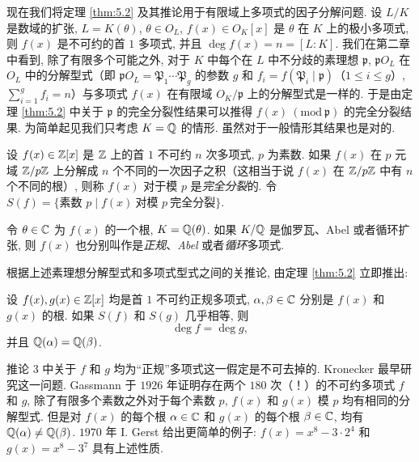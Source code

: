 \begin{sloppypar}
现在我们将定理 \ref{thm:5.2} 及其推论用于有限域上多项式的因子分解问题. 设 $L/K$ 是数域的扩张, $L=K(\theta)$, $\theta\in O_L$, $f(x)\in O_K[x]$ 是 $\theta$ 在 $K$ 上的极小多项式, 则 $f(x)$ 是不可约的首 $1$ 多项式, 并且 $\deg f(x)=n=[L:K]$. 我们在第二章中看到, 除了有限多个可能之外, 对于 $K$ 中每个在 $L$ 中不分歧的素理想 $\mathfrak{p}$, $\mathfrak{p}O_L$ 在 $O_L$ 中的分解型式（即 $\mathfrak{p}O_L=\mathfrak{P}_1\cdots\mathfrak{P}_g$ 的参数 $g$ 和 $f_i=f(\mathfrak{P}_i\mid\mathfrak{p})$（$1\leqslant i\leqslant g$）, $\sum\limits_{i=1}^{g}f_i=n$）与多项式 $f(x)$ 在有限域 $O_K/\mathfrak{p}$ 上的分解型式是一样的. 于是由定理 \ref{thm:5.2} 中关于 $\mathfrak{p}$ 的完全分裂性结果可以推得 $f(x)\ (\mathrm{mod}\ \mathfrak{p})$ 的完全分裂结果. 为简单起见我们只考虑 $K=\mathbb{Q}$ 的情形. 虽然对于一般情形其结果也是对的. 
\end{sloppypar}

\setcounter{definition}{2}%

\begin{definition}\label{def:ch5-3}
设 $f(x)\in\mathbb{Z}[x]$ 是 $\mathbb{Z}$ 上的首 $1$ 不可约 $n$ 次多项式, $p$ 为素数. 如果 $f(x)$ 在 $p$ 元域 $\mathbb{Z}/p\mathbb{Z}$ 上分解成 $n$ 个不同的一次因子之积（这相当于说 $f(x)$ 在 $\mathbb{Z}/p\mathbb{Z}$ 中有 $n$ 个不同的根）, 则称 $f(x)$ 对于模 $p$ 是\emph{完全分裂}的. 令 $S(f)=\{\text{素数 } p\mid f(x)\ \text{对模 } p\ \text{完全分裂}\}$. 
\end{definition}

令 $\theta\in\mathbb{C}$ 为 $f(x)$ 的一个根, $K=\mathbb{Q}(\theta)$. 如果 $K/\mathbb{Q}$ 是伽罗瓦、Abel 或者循环扩张, 则 $f(x)$ 也分别叫作是\emph{正规}、\emph{Abel} 或者\emph{循环}多项式. 

根据上述素理想分解型式和多项式型式之间的关推论, 由定理 \ref{thm:5.2} 立即推出: 

\begin{corollary}[3]
设 $f(x),g(x)\in\mathbb{Z}[x]$ 均是首 $1$ 不可约正规多项式, $\alpha,\beta\in\mathbb{C}$ 分别是 $f(x)$ 和 $g(x)$ 的根. 如果 $S(f)$ 和 $S(g)$ 几乎相等, 则
\[
  \deg f=\deg g,
\]
并且 $\mathbb{Q}(\alpha)=\mathbb{Q}(\beta)$. 
\end{corollary}

\begin{remark}
推论 3 中关于 $f$ 和 $g$ 均为``正规''多项式这一假定是不可去掉的. Kronecker 最早研究这一问题. Gassmann 于 $1926$ 年证明存在两个 $180$ 次（！）的不可约多项式 $f$ 和 $g$, 除了有限多个素数之外对于每个素数 $p$, $f(x)$ 和 $g(x)$ 模 $p$ 均有相同的分解型式. 但是对 $f(x)$ 的每个根 $\alpha\in\mathbb{C}$ 和 $g(x)$ 的每个根 $\beta\in\mathbb{C}$, 均有 $\mathbb{Q}(\alpha)\neq\mathbb{Q}(\beta)$. $1970$ 年 I. Gerst 给出更简单的例子: $f(x)=x^8-3\cdot2^4$ 和 $g(x)=x^8-3^7$ 具有上述性质. 
\end{remark}

